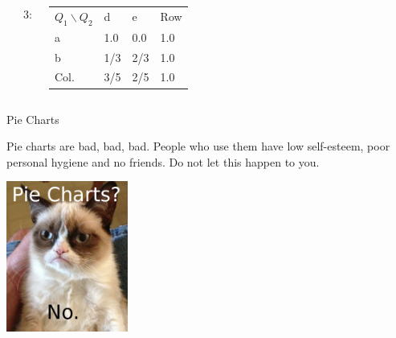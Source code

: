 {\begin{frame}
\begin{columns}
      \rule{5cm}{0.05cm}

      3:
      \begin{tabular}{l|l|l|l}
        $Q_1 \backslash Q_2$ & d & e & Row  \\
        a & 1.0 & 0.0 & 1.0 \\ \hline
        b & 1/3 & 2/3 & 1.0 \\ \hline
        Col.  & 3/5 & 2/5 & 1.0
      \end{tabular}


    \end{columns}

  \end{frame}
}


\begin{frame}{Pie Charts}

  Pie charts are bad, bad, bad. People who use them have low
  self-esteem, poor personal hygiene and no friends. Do not let this
  happen to you.

  \vfill

  \centerline{\includegraphics[width=4cm]{img/grumpyPieChart}}

  
\end{frame}


